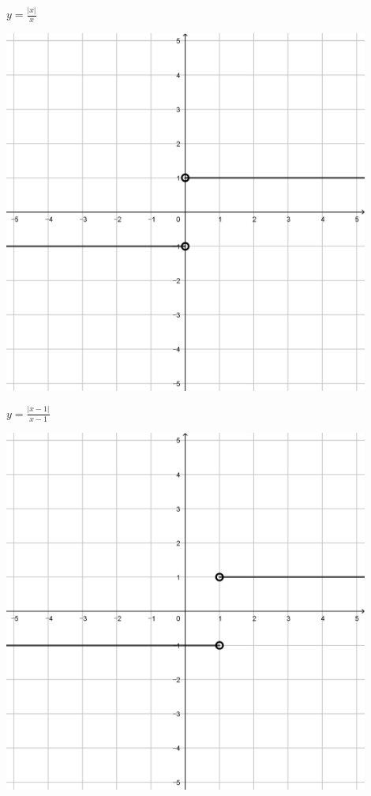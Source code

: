 \documentclass[a4paper]{oblivoir}
\begin{document}
\clearpage
\begin{minipage}{0.45\textwidth}\centering
\(y=\frac{|x|}{x}\)
\par\bigskip\includegraphics[width=0.9\textwidth]{img/3_piecewise_25}
\end{minipage}
\begin{minipage}{0.45\textwidth}\centering
\(y=\frac{|x-1|}{x-1}\)
\par\bigskip\includegraphics[width=0.9\textwidth]{img/3_piecewise_26}
\end{minipage}\bigskip\bigskip\par
\end{document}

